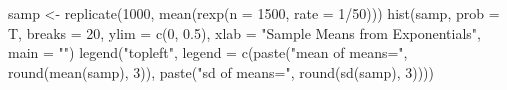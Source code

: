 \begin{Schunk}
\begin{Sinput}
 samp <- replicate(1000, mean(rexp(n = 1500, 
     rate = 1/50)))
 hist(samp, prob = T, breaks = 20, ylim = c(0, 
     0.5), xlab = "Sample Means from Exponentials", 
     main = "")
 legend("topleft", legend = c(paste("mean of means=", 
     round(mean(samp), 3)), paste("sd of means=", 
     round(sd(samp), 3))))
\end{Sinput}
\end{Schunk}

